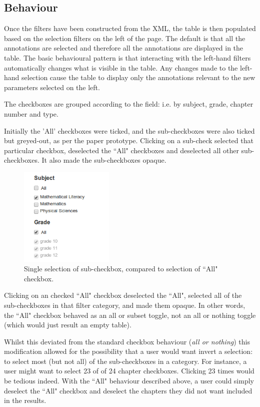 \subsection{Behaviour}
Once the filters have been constructed from the XML, the table is then populated based on  the selection filters on the left of the page. The default is that all the annotations are selected and therefore all the annotations are displayed in the table. The basic behavioural pattern is that interacting with the left-hand filters automatically changes what is visible in the table. Any changes made to the left-hand selection cause the table to display only the annotations relevant to the new parameters selected on the left. 

The checkboxes are grouped according to the field\citep[p. 439]{Galitz}: i.e. by subject, grade, chapter number and type. 

Initially the 'All' checkboxes were ticked, and the sub-checkboxes were also ticked but greyed-out, as per the paper prototype. Clicking on a sub-check selected that particular checkbox, deselected the ``All" checkboxes and deselected all other sub-checkboxes. It also made the sub-checkboxes opaque. 

\begin{figure}[h!]
    \centering
    \includegraphics[width=0.4\textwidth]{Figures/V1/checkboxes.png}
 \caption{Single selection of sub-checkbox, compared to selection of ``All" checkbox.}
 \label{fig:checkboxes}
\end{figure}

Clicking on an checked ``All" checkbox deselected the ``All", selected all of the sub-checkboxes in that filter category, and made them opaque. In other words, the ``All" checkbox behaved as an all or subset toggle, not an all or nothing toggle (which would just result an empty table). 

Whilst this deviated from the standard checkbox behaviour (\textit{all or nothing})\citep[p. 435]{Galitz} this modification allowed for the possibility that a user would want invert a selection: to select most (but not all) of the sub-checkboxes in a category. For instance, a user might want to select 23 of of 24 chapter checkboxes. Clicking 23 times would be tedious indeed. With the ``All" behaviour described above, a user could simply deselect the ``All" checkbox and deselect the chapters they did not want included in the results.

